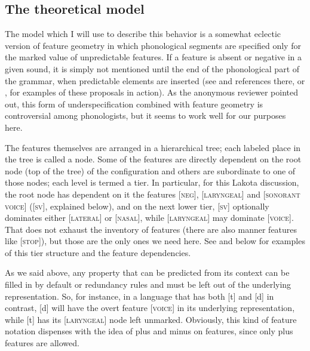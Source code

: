 \documentclass[output=paper]{LSP/langsci}
\begin{document}
\subsection{The theoretical model}

The model which I will use to describe this behavior is a somewhat eclectic version of feature geometry in which phonological segments are specified only for the marked value of unpredictable features. If a feature is absent or negative in a given sound, it is simply not mentioned until the end of the phonological part of the grammar, when predictable elements are inserted (see \citet{Rice1993} and references there, or \citet{Botma2011}, for examples of these proposals in action). As the anonymous reviewer pointed out, this form of underspecification combined with feature geometry is controversial among phonologists, but it seems to work well for our purposes here.

The features themselves are arranged in a hierarchical tree; each labeled place in the tree is called a node. Some of the features are directly dependent on the root node (top of the tree) of the configuration and others are subordinate to one of those nodes; each level is termed a tier. In particular, for this Lakota discussion, the root node has dependent on it the features [\textsc{neg}], [\textsc{laryngeal}] and [\textsc{sonorant voice}] ([\textsc{sv}], explained below), and on the next lower tier, [\textsc{sv}] optionally dominates either [\textsc{lateral}] or [\textsc{nasal}], while [\textsc{laryngeal}] may dominate [\textsc{voice}]. That does not exhaust the inventory of features (there are also manner features like [\textsc{stop}]), but those are the only ones we need here. See  and  below for examples of this tier structure and the feature dependencies.

As we said above, any property that can be predicted from its context can be filled in by default or redundancy rules and must be left out of the underlying representation. So, for instance, in a language that has both [t] and [d] in contrast, [d] will have the overt feature [\textsc{voice}] in its underlying representation, while [t] has its [\textsc{laryngeal}] node left unmarked. Obviously, this kind of feature notation dispenses with the idea of plus and minus on features, since only plus features are allowed.
\end{document}
